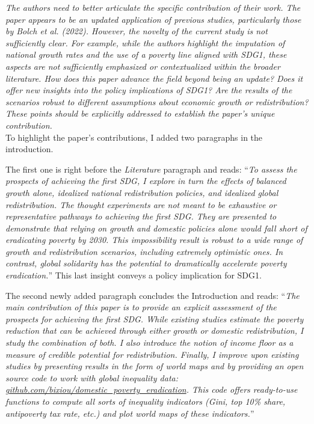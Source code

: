 \documentclass[12pt,english]{article}
\begin{document}
\textit{The authors need to better articulate the specific contribution of their work. The paper appears to be an updated application of previous studies, particularly those by Bolch et al. (2022). However, the novelty of the current study is not sufficiently clear. For example, while the authors highlight the imputation of national growth rates and the use of a poverty line aligned with SDG1, these aspects are not sufficiently emphasized or contextualized within the broader literature. How does this paper advance the field beyond being an update? Does it offer new insights into the policy implications of SDG1? Are the results of the scenarios robust to different assumptions about economic growth or redistribution? These points should be explicitly addressed to establish the paper's unique contribution. }~\\

To highlight the paper's contributions, I added two paragraphs in the introduction. 

The first one is right before the \textit{Literature} paragraph and reads: ``\textit{To assess the prospects of achieving the first SDG, I explore in turn the effects of balanced growth alone, idealized national redistribution policies, and idealized global redistribution. The thought experiments are not meant to be exhaustive or representative pathways to achieving the first SDG. They are presented to demonstrate that relying on growth and domestic policies alone would fall short of eradicating poverty by 2030. This impossibility result is robust to a wide range of growth and redistribution scenarios, including extremely optimistic ones. In contrast, global solidarity has the potential to dramatically accelerate poverty eradication.}'' This last insight conveys a policy implication for SDG1.

The second newly added paragraph concludes the Introduction and reads: ``\textit{The main contribution of this paper is to provide an explicit assessment of the prospects for achieving the first SDG. While existing studies estimate the poverty reduction that can be achieved through either growth or domestic redistribution, I study the combination of both. I also introduce the notion of \textit{income floor} as a measure of credible potential for redistribution. Finally, I improve upon existing studies by presenting results in the form of world maps and by providing an open source code to work with global inequality data: \href{https://github.com/bixiou/domestic_poverty_eradication}{github.com/bixiou/domestic\_poverty\_eradication}. This code offers ready-to-use functions to compute all sorts of inequality indicators (Gini, top 10\% share, antipoverty tax rate, etc.) and plot world maps of these indicators.}''
\end{document}
